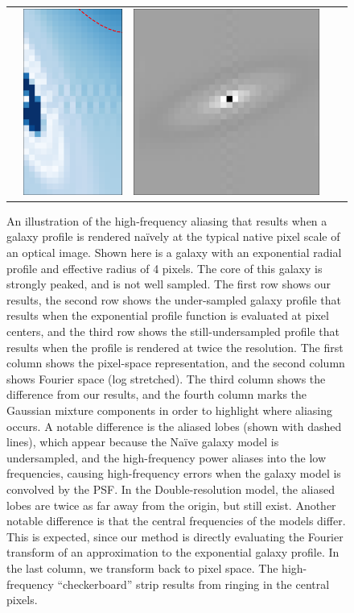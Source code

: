 \documentclass[11pt,letterpaper]{aastex63}
\begin{document}
\begin{figure}[p!]
\begin{center}
\begin{tabular}{@{}ccccc@{}}
      &
      \includegraphics[height=0.24\textwidth]{lopass-diff-dclipmine-fourier-ann}
      &
      \includegraphics[height=0.24\textwidth]{lopass-diff-dclipmine-pix}
    \end{tabular}
    \caption{
      \label{fig:aliasing}
      An illustration of the high-frequency aliasing that results when
      a galaxy profile is rendered na\"ively at the typical native
      pixel scale of an optical image.  Shown here is a galaxy with an
      exponential radial profile and effective radius of 4 pixels.
      The core of this galaxy is strongly peaked, and is not well
      sampled.  The first row shows our results, the second row shows
      the under-sampled galaxy profile that results when the
      exponential profile function is evaluated at pixel centers, and
      the third row shows the still-undersampled profile that results
      when the profile is rendered at twice the resolution.
      The first column shows the pixel-space representation, and the
      second column shows Fourier space (log stretched).  The third
      column shows the difference from our results, and the fourth
      column marks the Gaussian mixture components in order to
      highlight where aliasing occurs.  A notable difference is the
      aliased lobes (shown with dashed lines), which appear because
      the Na\"ive galaxy model is undersampled, and the high-frequency
      power aliases into the low frequencies, causing high-frequency
      errors when the galaxy model is convolved by the PSF.  In the
      Double-resolution model, the aliased lobes are twice as far away
      from the origin, but still exist.  Another notable difference is
      that the central frequencies of the models differ.  This is
      expected, since our method is directly evaluating the Fourier
      transform of an approximation to the exponential galaxy profile.
      In the last column, we transform back to pixel space.  The
      high-frequency ``checkerboard'' strip results from ringing in
      the central pixels.
    }
  \end{center}
\end{figure}
\end{document}
